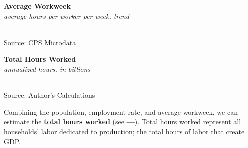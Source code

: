 \documentclass{report}
\makeatletter
\newcommand*\short[1]{\expandafter\@gobbletwo\number\numexpr#1\relax}
\newcommand{\shdateaxisticks}{
		date coordinates in=x, axis line style={draw=none},
		xmax={2023-10-01},
		max space between ticks=40,	    
		xtick={{1990-01-01}, {1995-01-01}, {2000-01-01}, 
			{2005-01-01}, {2010-01-01}, {2015-01-01}, {2020-01-01}},
		minor xtick={},
		enlarge y limits={0.06}, enlarge x limits={0.01},
		}
\newcommand{\stdline}[4]{\addplot[very thick, no markers, color=#1] 
		table [x=#2, y=#3, col sep=comma] {#4};	}
\newcommand{\rbars}{
		\fill[color=black!10] (axis cs:{1990-07-01},\pgfkeysvalueof{/pgfplots/ymin}) rectangle 
			(axis cs:{1991-03-01}, \pgfkeysvalueof{/pgfplots/ymax});
		\fill[color=black!10] (axis cs:{2007-12-01},\pgfkeysvalueof{/pgfplots/ymin}) rectangle 
			(axis cs:{2009-07-01}, \pgfkeysvalueof{/pgfplots/ymax});
		\fill[color=black!10] (axis cs:{2001-03-01},\pgfkeysvalueof{/pgfplots/ymin}) rectangle 
			(axis cs:{2001-11-01}, \pgfkeysvalueof{/pgfplots/ymax});
		\fill[color=black!10] (axis cs:{2020-02-01},\pgfkeysvalueof{/pgfplots/ymin}) rectangle 
			(axis cs:{2020-05-01}, \pgfkeysvalueof{/pgfplots/ymax});}
\makeatother
\begin{document}
\begin{minipage}{0.76\textwidth}
\begin{minipage}{0.49\textwidth}
\normalsize \textbf{Average Workweek}\\
\footnotesize{\textit{average hours per worker per week, trend}}\\
\hspace*{-2mm} \\
\footnotesize{Source: CPS Microdata} 
\end{minipage} \hspace{4mm}
\begin{minipage}{0.49\textwidth}
\normalsize \textbf{Total Hours Worked}\\
\footnotesize{\textit{annualized hours, in billions}}\\
\hspace*{-2mm} \\
\footnotesize{Source: Author's Calculations}
\end{minipage}

\vspace{2mm}

\small Combining the population, employment rate, and average workweek, we can estimate the \textbf{total hours worked} (see {\color{orange}\textbf{---}}). Total hours worked represent all households' labor dedicated to production; the total hours of labor that create GDP. 

\end{minipage}
\newpage
\end{document}
